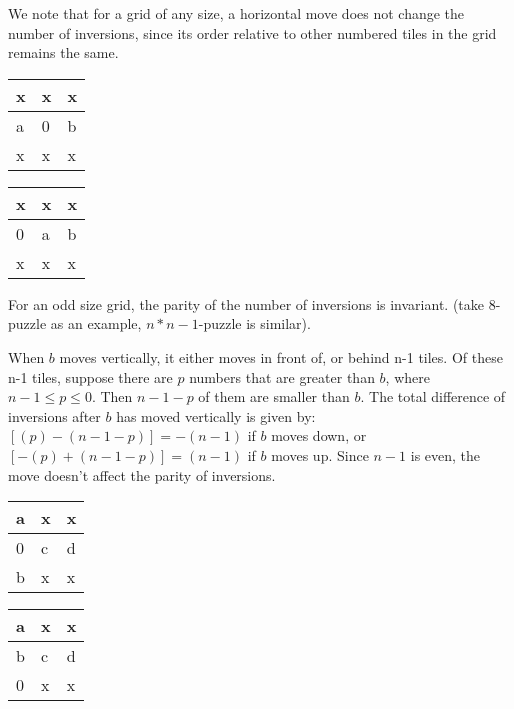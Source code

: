 \documentclass{llncs}
\begin{document}
We note that for a grid of any size, a horizontal move does not change the number of inversions, since its order relative to other numbered tiles in the grid remains the same.
\begin{table}
\label{tab1}
\begin{tabular}{|p{2cm}|p{2cm}|p{2cm}|}
\hline
x &  x & x\\
\hline
a & 0 & b\\
\hline
x & x & x\\
\hline
\end{tabular}
\end{table}
\begin{table}
\label{tab2}
\begin{tabular}{|p{2cm}|p{2cm}|p{2cm}|}
\hline
x &  x & x\\
\hline
0 & a & b\\
\hline
x & x & x\\
\hline
\end{tabular}
\end{table}
\begin{claim}
For an odd size grid, the parity of the number of inversions is invariant. (take 8-puzzle as an example, $n*n-1$-puzzle is similar).
\end{claim}
When $b$ moves vertically, it either moves in front of, or behind n-1 tiles.
Of these n-1 tiles, suppose there are $p$ numbers that are greater than $b$, where $n-1 \leq p \leq 0$. Then $n-1-p$ of them are smaller than $b$. The total difference of inversions after $b$ has moved vertically is given by:
$[(p)-(n-1-p)]= -(n-1)$ if $b$ moves down, or  $[-(p) +(n-1-p)]= (n-1)$ if $b$ moves up. Since $n-1$ is even, the move doesn’t affect the parity of inversions.
\begin{table}
\label{tab3}
\begin{tabular}{|p{2cm}|p{2cm}|p{2cm}|}
\hline
a &  x & x\\
\hline
0 & c & d\\
\hline
b & x & x\\
\hline
\end{tabular}
\end{table}
\begin{table}
\label{tab4}
\begin{tabular}{|p{2cm}|p{2cm}|p{2cm}|}
\hline
a &  x & x\\
\hline
b & c & d\\
\hline
0 & x & x\\
\hline
\end{tabular}
\end{table}
\end{document}
